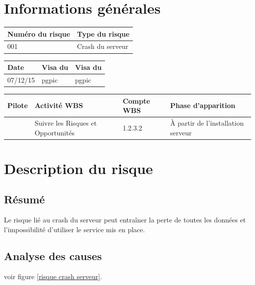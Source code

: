 \section*{Informations générales}
 
\begin{table}[H]
\centering
	\begin{tabularx}{16.8cm}{|X|X|}
	\hline
	\rowcolor{gray!40} Numéro du risque & Type du risque \\
	\hline
	001 & Crash du serveur \\
	\hline
	\end{tabularx}
\end{table}

\begin{table}[H]
\centering
	\begin{tabularx}{16.8cm}{|X|X|X|}
	\hline
	\rowcolor{gray!40} Date & Visa du \RQ & Visa du \CP \\
	\hline
	 07/12/15 & pgpic & pgpic \\
	\hline
	\end{tabularx}
\end{table}

\begin{table}[H]
\centering
	\begin{tabularx}{16.8cm}{|X|X|X|X|}
	\hline
	\rowcolor{gray!40} Pilote & Activité WBS & Compte WBS & Phase d'apparition \\
	\hline
	 \Matthieu & Suivre les Risques et Opportunités & 1.2.3.2 & À partir de l’installation serveur\\
	\hline
	\end{tabularx}
\end{table}

\section*{Description du risque}

\subsection*{Résumé}
	Le risque lié au crash du serveur peut entraîner la perte de toutes les données et l'impossibilité d'utiliser le service mis en place.
	
\subsection*{Analyse des causes}
	voir figure \ref{risque crash serveur}.

